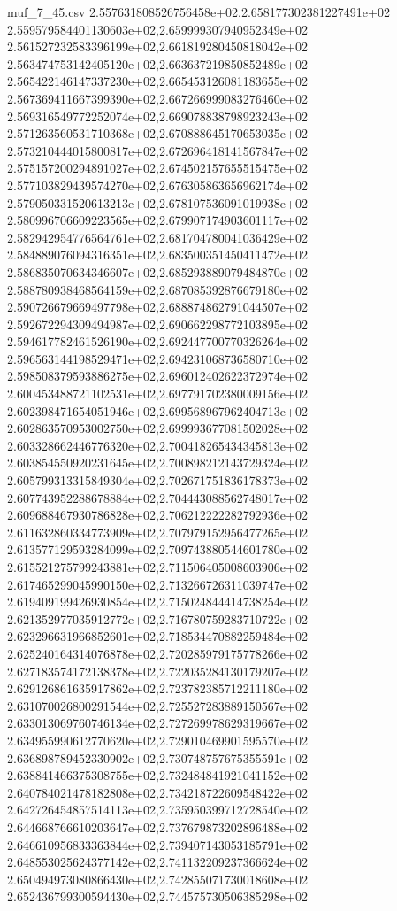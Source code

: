\begin{filecontents*}{muf_7_45.csv}
2.557631808526756458e+02,2.658177302381227491e+02
2.559579584401130603e+02,2.659999307940952349e+02
2.561527232583396199e+02,2.661819280450818042e+02
2.563474753142405120e+02,2.663637219850852489e+02
2.565422146147337230e+02,2.665453126081183655e+02
2.567369411667399390e+02,2.667266999083276460e+02
2.569316549772252074e+02,2.669078838798923243e+02
2.571263560531710368e+02,2.670888645170653035e+02
2.573210444015800817e+02,2.672696418141567847e+02
2.575157200294891027e+02,2.674502157655515475e+02
2.577103829439574270e+02,2.676305863656962174e+02
2.579050331520613213e+02,2.678107536091019938e+02
2.580996706609223565e+02,2.679907174903601117e+02
2.582942954776564761e+02,2.681704780041036429e+02
2.584889076094316351e+02,2.683500351450411472e+02
2.586835070634346607e+02,2.685293889079484870e+02
2.588780938468564159e+02,2.687085392876679180e+02
2.590726679669497798e+02,2.688874862791044507e+02
2.592672294309494987e+02,2.690662298772103895e+02
2.594617782461526190e+02,2.692447700770326264e+02
2.596563144198529471e+02,2.694231068736580710e+02
2.598508379593886275e+02,2.696012402622372974e+02
2.600453488721102531e+02,2.697791702380009156e+02
2.602398471654051946e+02,2.699568967962404713e+02
2.602863570953002750e+02,2.699993677081502028e+02
2.603328662446776320e+02,2.700418265434345813e+02
2.603854550920231645e+02,2.700898212143729324e+02
2.605799313315849304e+02,2.702671751836178373e+02
2.607743952288678884e+02,2.704443088562748017e+02
2.609688467930786828e+02,2.706212222282792936e+02
2.611632860334773909e+02,2.707979152956477265e+02
2.613577129593284099e+02,2.709743880544601780e+02
2.615521275799243881e+02,2.711506405008603906e+02
2.617465299045990150e+02,2.713266726311039747e+02
2.619409199426930854e+02,2.715024844414738254e+02
2.621352977035912772e+02,2.716780759283710722e+02
2.623296631966852601e+02,2.718534470882259484e+02
2.625240164314076878e+02,2.720285979175778266e+02
2.627183574172138378e+02,2.722035284130179207e+02
2.629126861635917862e+02,2.723782385712211180e+02
2.631070026800291544e+02,2.725527283889150567e+02
2.633013069760746134e+02,2.727269978629319667e+02
2.634955990612770620e+02,2.729010469901595570e+02
2.636898789452330902e+02,2.730748757675355591e+02
2.638841466375308755e+02,2.732484841921041152e+02
2.640784021478182808e+02,2.734218722609548422e+02
2.642726454857514113e+02,2.735950399712728540e+02
2.644668766610203647e+02,2.737679873202896488e+02
2.646610956833363844e+02,2.739407143053185791e+02
2.648553025624377142e+02,2.741132209237366624e+02
2.650494973080866430e+02,2.742855071730018608e+02
2.652436799300594430e+02,2.744575730506385298e+02

\end{filecontents*}
